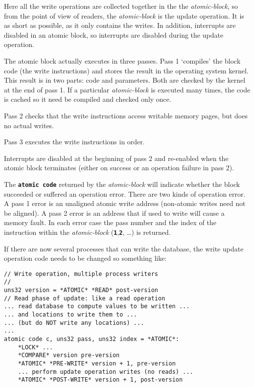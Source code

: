 \documentclass[12pt]{article}
\newcommand{\TT}[1]{{\tt \bfseries #1}}
\newenvironment{indpar}[1][0.3in]%
	{\begin{list}{}%
		     {\setlength{\itemsep}{0in}%
		      \setlength{\topsep}{0in}%
		      \setlength{\parsep}{1ex}%
		      \setlength{\labelwidth}{#1}%
		      \setlength{\leftmargin}{#1}%
		      \addtolength{\leftmargin}{\labelsep}}%
	 \item}%
	{\end{list}}
\begin{document}
Here all the write operations are collected together in the
the {\em atomic-block}, so from the point of view of readers,
the {\em atomic-block} is the update operation.  It is as short
as possible, as it only contains the writes.  In addition,
interrupts are disabled in an atomic block, so interrupts are
disabled during the update operation.

The atomic block actually executes in three passes.  Pass 1 `compiles'
the block code (the write instructions) and stores the result in
the operating system kernel.  This result is in two parts: code and
parameters.  Both are checked by the kernel at the end of pass 1.
If a particular {\em atomic-block} is executed many
times, the code is cached so it need be compiled and checked only once.

Pass 2 checks that the write instructions access writable memory pages,
but does no actual writes.

Pass 3 executes the write instructions in order.

Interrupts are disabled at the beginning of pass 2 and re-enabled when
the atomic block terminates (either on success or an operation failure
in pass 2).

The \TT{atomic code} returned by the {\em atomic-block} will indicate
whether the block succeeded or suffered an operation error.  There
are two kinds of operation error.  A pass 1 error is an unaligned
atomic write address (non-atomic writes need not be aligned).  A pass 2
error is an address that if used to write will cause a memory fault.
In each error case the pass number and the index of the instruction within
the {\em atomic-block} (\TT{1},\TT{2}, \ldots) is returned.

If there are now several processes that can write the database, the
write update operation code needs to be changed so something like:
\begin{indpar}\begin{verbatim}
// Write operation, multiple process writers
//
uns32 version = *ATOMIC* *READ* post-version
// Read phase of update: like a read operation
... read database to compute values to be written ...
... and locations to write them to ...
... (but do NOT write any locations) ...
...
atomic code c, uns32 pass, uns32 index = *ATOMIC*:
    *LOCK* ...
    *COMPARE* version pre-version
    *ATOMIC* *PRE-WRITE* version + 1, pre-version
    ... perform update operation writes (no reads) ...
    *ATOMIC* *POST-WRITE* version + 1, post-version
\end{verbatim}\end{indpar}
\end{document}
